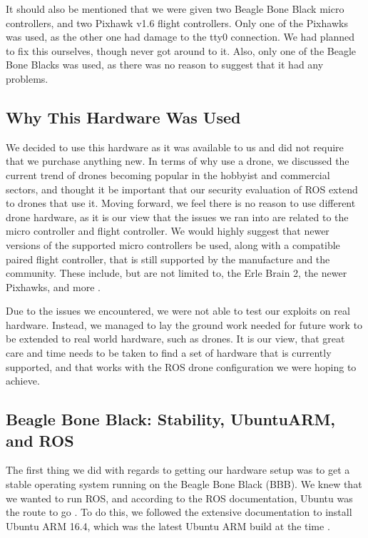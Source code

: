 \documentclass[IEEEtran,letterpaper,10pt,notitlepage,draftclsnofoot]{article}
\begin{document}
It should also be mentioned that we were given two Beagle Bone Black micro controllers, and two
Pixhawk v1.6 flight controllers. Only one of the Pixhawks was used, as the other one had damage to the
tty0 connection. We had planned to fix this ourselves, though never got around to it. Also, only one of the
Beagle Bone Blacks was used, as there was no reason to suggest that it had any problems.

\subsection{Why This Hardware Was Used}

We decided to use this hardware as it was available to us and did not require that we purchase anything new.
In terms of why use a drone, we discussed the current trend of drones becoming popular in the hobbyist and
commercial sectors, and thought it be important that our security evaluation of ROS extend to drones that use it. Moving forward, we feel there is no reason to use different drone hardware, as it is our view that the
issues we ran into are related to the micro controller and flight controller. We would highly suggest that
newer versions of the supported micro controllers be used, along with a compatible paired flight controller,
that is still supported by the manufacture and the community. These include, but are not limited to, the
Erle Brain 2, the newer Pixhawks, and more \cite{ArduFlightController}.

Due to the issues we encountered, we were not able to test our exploits on real hardware. Instead, we managed
to lay the ground work needed for future work to be extended to real world hardware, such as drones. It is
our view, that great care and time needs to be taken to find a set of hardware that is currently supported,
and that works with the ROS drone configuration we were hoping to achieve.

\subsection{Beagle Bone Black: Stability, UbuntuARM, and ROS}

The first thing we did with regards to getting our hardware setup was to get a stable operating system
running on the Beagle Bone Black (BBB). We knew that we wanted to run ROS, and according to the ROS
documentation, Ubuntu was the route to go \cite{ROSBBBUbuntu}. To do this, we followed
the extensive documentation to install Ubuntu ARM 16.4, which was the latest Ubuntu ARM build at the time
\cite{eLinuxBBB}.
\end{document}
